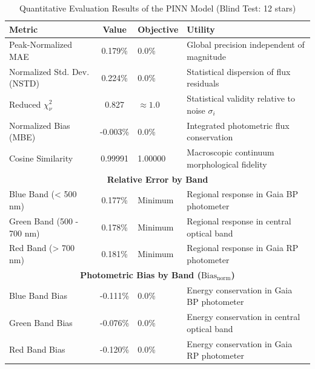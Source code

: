 
\begin{table}[htpb]
\centering
\caption{Quantitative Evaluation Results of the PINN Model (Blind Test: 12 stars)}
\label{tab:pinn_evaluation}
\begin{tabular}{lcll}
\hline
\textbf{Metric} & \textbf{Value} & \textbf{Objective} & \textbf{Utility} \\
\hline
Peak-Normalized MAE & 0.179\% & 0.0\% & Global precision independent of magnitude \\
Normalized Std. Dev. (NSTD) & 0.224\% & 0.0\% & Statistical dispersion of flux residuals \\
Reduced $\chi^2_\nu$ & 0.827 & $\approx 1.0$ & Statistical validity relative to noise $\sigma_i$ \\
Normalized Bias (MBE) & -0.003\% & 0.0\% & Integrated photometric flux conservation \\
Cosine Similarity & 0.99991 & 1.00000 & Macroscopic continuum morphological fidelity \\
\hline
\multicolumn{4}{c}{\textbf{Relative Error by Band}} \\
\hline
Blue Band (< 500 nm) & 0.177\% & Minimum & Regional response in Gaia BP photometer \\
Green Band (500 - 700 nm) & 0.178\% & Minimum & Regional response in central optical band \\
Red Band (> 700 nm) & 0.181\% & Minimum & Regional response in Gaia RP photometer \\
\hline
\multicolumn{4}{c}{\textbf{Photometric Bias by Band ($\text{Bias}_{\text{norm}}$)}} \\
\hline
Blue Band Bias & -0.111\% & 0.0\% & Energy conservation in Gaia BP photometer \\
Green Band Bias & -0.076\% & 0.0\% & Energy conservation in central optical band \\
Red Band Bias & -0.120\% & 0.0\% & Energy conservation in Gaia RP photometer \\
\hline
\end{tabular}
\end{table}
